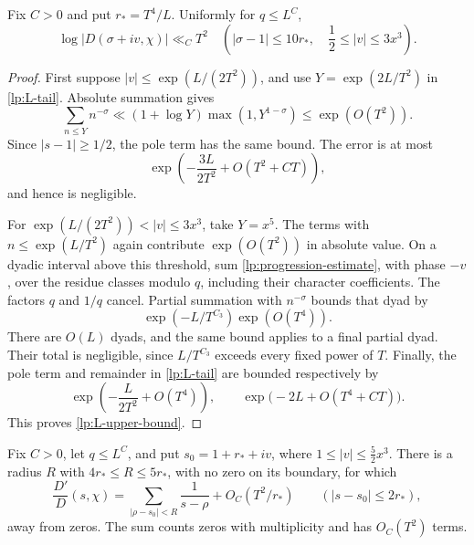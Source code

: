 \begin{lemma}[A bound near the line $\operatorname{Re}s=1$]
\label{lp:L-upper}
Fix $C>0$ and put $r_*=T^4/L$.  Uniformly for $q\le L^C$,
\begin{equation}\label{lp:L-upper-bound}
 \log|D(\sigma+iv,\chi)|\ll_C T^2
 \quad\left(|\sigma-1|\le10r_*,\quad
                   \frac12\le|v|\le3x^3\right).
\end{equation}
\end{lemma}

\begin{proof}
First suppose $|v|\le\exp(L/(2T^2))$, and use
$Y=\exp(2L/T^2)$ in \eqref{lp:L-tail}.  Absolute summation gives
\[
 \sum_{n\le Y}n^{-\sigma}
 \ll(1+\log Y)\max(1,Y^{1-\sigma})\le\exp(O(T^2)).
\]
Since $|s-1|\ge1/2$, the pole term has the same bound.  The error is
at most
\[
 \exp\left(-\frac{3L}{2T^2}+O(T^2+CT)\right),
\]
and hence is negligible.

For $\exp(L/(2T^2))<|v|\le3x^3$, take $Y=x^5$.
The terms with $n\le\exp(L/T^2)$ again contribute
$\exp(O(T^2))$ in absolute value.  On a dyadic interval above this
threshold, sum \eqref{lp:progression-estimate}, with phase $-v$, over
the residue classes modulo $q$, including their character coefficients.
The factors $q$ and $1/q$ cancel.  Partial summation with $n^{-\sigma}$
bounds that dyad by
\[
 \exp(-L/T^{C_3})\exp(O(T^4)).
\]
There are $O(L)$ dyads, and the same bound applies to a final partial
dyad.  Their total is negligible, since $L/T^{C_3}$ exceeds every
fixed power of $T$.  Finally, the pole term and remainder in
\eqref{lp:L-tail} are bounded respectively by
\[
 \exp\left(-\frac{L}{2T^2}+O(T^4)\right),\qquad
 \exp\bigl(-2L+O(T^4+CT)\bigr).
\]
This proves \eqref{lp:L-upper-bound}.
\end{proof}

\begin{lemma}\label{lp:local-log-derivative}
Fix $C>0$, let $q\le L^C$, and put
$s_0=1+r_*+iv$, where $1\le|v|\le\tfrac52x^3$.
There is a radius $R$ with $4r_*\le R\le5r_*$, with no zero on
its boundary, for which
\begin{equation}\label{lp:local-log-derivative-formula}
 \frac{D'}{D}(s,\chi)
 =\sum_{|\rho-s_0|<R}\frac1{s-\rho}
       +O_C(T^2/r_*)\qquad(|s-s_0|\le2r_*),
\end{equation}
away from zeros.  The sum counts zeros with multiplicity and has
$O_C(T^2)$ terms.
\end{lemma}

